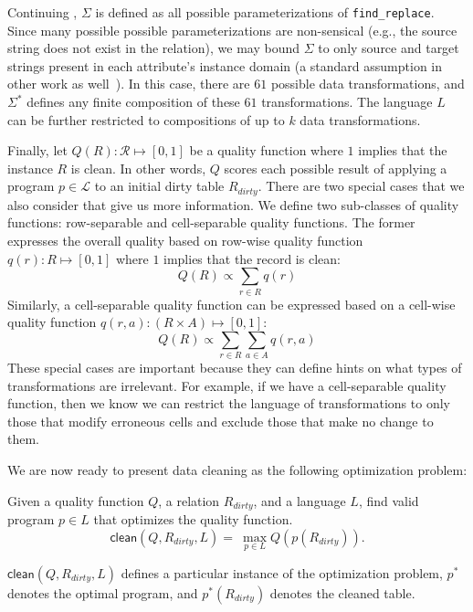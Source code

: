 \begin{example}\label{ex2}
  Continuing , $\Sigma$ is defined as all possible parameterizations of \texttt{find\_replace}.  Since many possible possible parameterizations are non-sensical (e.g., the source string does not exist in the relation), we may bound $\Sigma$ to only source and target strings present in each attribute's instance domain (a standard assumption in other work as well~\cite{DBLP:series/synthesis/2012Fan}).  In this case, there are $61$ possible data transformations, and $\Sigma^*$ defines any finite composition of these $61$ transformations.  The language $L$ can be further restricted to compositions of up to $k$ data transformations.  
\end{example}

Finally, let $Q(R): \mathcal{R} \mapsto [0,1]$ be a quality function where $1$ implies that the instance $R$ is clean.
In other words, $Q$ scores each possible result of applying a program $p \in \mathcal{L}$ to an initial dirty table $R_{dirty}$.
There are two special cases that we also consider that give us more information. 
We define two sub-classes of quality functions: row-separable and cell-separable quality functions.
The former expresses the overall quality based on row-wise quality function $q(r): R \mapsto [0,1]$ where $1$ implies that the record is clean:
\[Q(R) \propto \sum_{r \in R} q(r)\]
\noindent Similarly, a cell-separable quality function can be expressed based on a cell-wise quality function $q(r, a): (R\times A) \mapsto [0,1]$:
\[Q(R) \propto \sum_{r \in R} \sum_{a \in A} q(r,a)\]
These special cases are important because they can define hints on what types of transformations are irrelevant.
For example, if we have a cell-separable quality function, then we know we can restrict the language of transformations to only those that modify erroneous cells and exclude those that make no change to them.

\noindent We are now ready to present data cleaning as the following optimization problem:
\begin{problem}
Given a quality function $Q$, a relation $R_{dirty}$, and a language $L$, find valid program $p \in L$ that optimizes the quality function.
\[
\textsf{clean}(Q,R_{dirty},L) = ~ \max_{p \in L} Q( p(R_{dirty}) ).  
\]
\end{problem}
$\textsf{clean}(Q,R_{dirty},L)$ defines a particular instance of the optimization problem, $p^*$ denotes the optimal program, and $p^*(R_{dirty})$ denotes the cleaned table.


